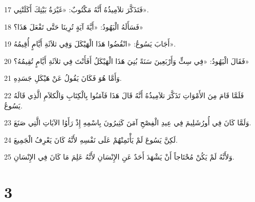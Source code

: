 \par 17 فَتَذَكَّرَ تلاَمِيذُهُ أَنَّهُ مَكْتُوبٌ: «غَيْرَةُ بَيْتِكَ أَكَلَتْنِي».
\par 18 فَسَأَلَهُ الْيَهُودُ: «أَيَّةَ آيَةٍ تُرِينَا حَتَّى تَفْعَلَ هَذَا؟»
\par 19 أَجَابَ يَسُوعُ: «انْقُضُوا هَذَا الْهَيْكَلَ وَفِي ثلاَثَةِ أَيَّامٍ أُقِيمُهُ».
\par 20 فَقَالَ الْيَهُودُ: «فِي سِتٍّ وَأَرْبَعِينَ سَنَةً بُنِيَ هَذَا الْهَيْكَلُ أَفَأَنْتَ فِي ثلاَثَةِ أَيَّامٍ تُقِيمُهُ؟»
\par 21 وَأَمَّا هُوَ فَكَانَ يَقُولُ عَنْ هَيْكَلِ جَسَدِهِ.
\par 22 فَلَمَّا قَامَ مِنَ الأَمْوَاتِ تَذَكَّرَ تلاَمِيذُهُ أَنَّهُ قَالَ هَذَا فَآمَنُوا بِالْكِتَابِ وَالْكلاَمِ الَّذِي قَالَهُ يَسُوعُ.
\par 23 وَلَمَّا كَانَ فِي أُورُشَلِيمَ فِي عِيدِ الْفِصْحِ آمَنَ كَثِيرُونَ بِاسْمِهِ إِذْ رَأَوُا الآيَاتِ الَّتِي صَنَعَ.
\par 24 لَكِنَّ يَسُوعَ لَمْ يَأْتَمِنْهُمْ عَلَى نَفْسِهِ لأَنَّهُ كَانَ يَعْرِفُ الْجَمِيعَ.
\par 25 وَلأَنَّهُ لَمْ يَكُنْ مُحْتَاجاً أَنْ يَشْهَدَ أَحَدٌ عَنِ الإِنْسَانِ لأَنَّهُ عَلِمَ مَا كَانَ فِي الإِنْسَانِ.

\chapter{3}

